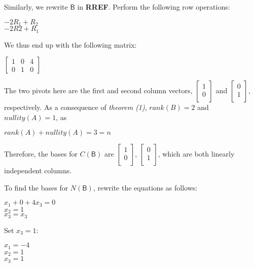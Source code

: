 \documentclass[a4paper, 11pt]{article}
\newcommand{\mat}[1]{\boldsymbol { \mathsf{#1}} }
\begin{document}
\begin{enumerate}
Similarly, we rewrite $\mat{B}$ in \textbf{RREF}. Perform the following row operations:

\begin{center}
	$-2R_1 + R_2$ \\
	$-2R2 + R_1$ \\
\end{center}

We thus end up with the following matrix:

	$\begin{bmatrix}
	1 & 0 & 4 \\
	0 & 1 & 0 
	\end{bmatrix}$


The two pivots here are the first and second column vectors, 
$\begin{bmatrix}
1 \\
0 \\
\end{bmatrix}$ and 
$\begin{bmatrix}
0 \\
1 \\
\end{bmatrix}$, 
respectively. As a consequence of \textit{theorem (1)}, $rank(B) = 2$ and $nullity(A) = 1$, as 

    $rank(A) + nullity(A) = 3 = n$


Therefore, the bases for $C(\mat{B})$ are $\begin{bmatrix}
1 \\
0 \\
\end{bmatrix}$, $\begin{bmatrix}
0 \\
1 \\
\end{bmatrix}$, which are both linearly independent columns.

To find the bases for $N(\mat{B})$, rewrite the equations as follows:
\begin{center}
    $x_1 + 0 + 4x_3 = 0$ \\
    $x_2 = 1$ \\ 
    $x_3 = x_3$ 
\end{center}

Set $x_3 = 1$:

\begin{center}
    $x_1  = -4$ \\
    $x_2 = 1$ \\
    $x_3 = 1$ \\
\end{center}



\end{enumerate}
\end{document}
